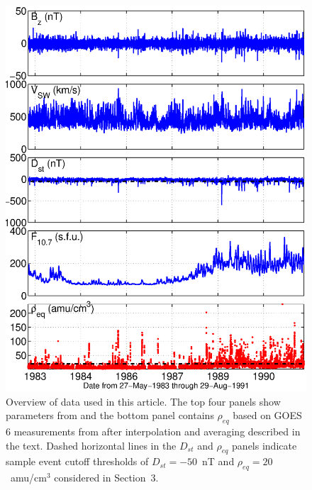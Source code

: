 \documentclass[12pt]{article}
\begin{document}
\begin{figure}[htp!]
\centering
\includegraphics[scale=0.45]{figures/alldata-GOES6-1983-1991.eps}
\caption{Overview of data used in this article. The top four panels show parameters from \cite{Kondrashov2014ReconstructionOfGaps} and the bottom panel contains $\rho_{eq}$ based on GOES 6 measurements from \cite{Denton} after interpolation and averaging described in the text. Dashed horizontal lines in the $D_{st}$ and $\rho_{eq}$ panels indicate sample event cutoff thresholds of $D_{st} = -50$~nT and $\rho_{eq} = 20$~amu/cm$^3$ considered in Section~3.}
\label{fig:AllData}
\end{figure}

\clearpage
\end{document}
